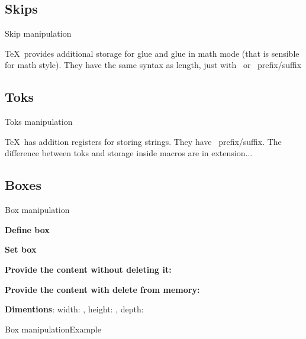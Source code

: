 \subsection{Skips}

\begin{frame}{Skip manipulation\tW\magicPage}\relax

\TeX\ provides additional storage for glue and glue in math mode (that is sensible for math style). They have the same syntax as length, just with \ccol\skip\ or \ccol\muskip\ prefix/suffix
\end{frame}

\subsection{Toks}

\begin{frame}{Toks manipulation\tw\magicPage}\relax

\TeX\ has addition registers for storing strings. They have \ccol\toks\ prefix/suffix. The difference between toks and storage inside macros are in extension... 
     
\end{frame}


\subsection{Boxes}

\begin{frame}{Box manipulation\tW\magicPage}\relax

\textbf{Define box} 

\textbf{Set box} 

\textbf{Provide the content without deleting it:} 

\textbf{Provide the content with delete from memory:} 

\textbf{Dimentions}: width: \ccol\wd, height: \ccol\ht, depth: \ccol\dp

\end{frame}

\begin{frame}{Box manipulation\tW\magicPage}{Example}\relax


\end{frame}


